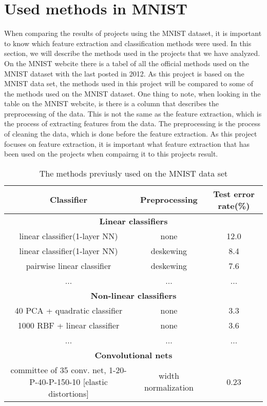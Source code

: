 \section{Used methods in MNIST}
\label{sec:method-MNIST}
When comparing the results of projects using the MNIST dataset, it is important to know which feature extraction and classification methods were used. In this section, we will describe the methods used in the projects that we have analyzed. 
On the MNIST webcite \cite{MNIST} there is a tabel of all the official methods used on the MNIST dataset with the last posted in 2012. As this project is based on the MNIST data set, the methods used in this project will be compared to some of the methods used on the MNIST dataset. One thing to note, when looking in the table on the MNIST webcite, is there is a column that describes the preprocessing of the data. 
This is not the same as the feature extraction, which is the process of extracting features from the data. The preprocessing is the process of cleaning the data, which is done before the feature extraction. As this project focuses on feature extraction, it is important what feature extraction that has been used on the projects when compairng it to this projects result. 
\begin{table}[h]
  \centering
  \resizebox{1\textwidth}{!}
  {
  \begin{tabular}{|c|c|c|}
      \hline
      Classifier & Preprocessing & Test error rate(\%)\\
      \hline
      \multicolumn{3}{|c|}{\textbf{Linear classifiers}} \\
      \hline
      linear classifier(1-layer NN) & none & 12.0 \\
      linear classifier(1-layer NN) & deskewing & 8.4 \\
      pairwise linear classifier & deskewing & 7.6 \\
      \hline
      ... & ... & ... \\ 
      \hline
      \multicolumn{3}{|c|}{\textbf{Non-linear classifiers}} \\
      \hline
      40 PCA + quadratic classifier & none & 3.3 \\
      1000 RBF + linear classifier & none & 3.6 \\
      \hline
      ... & ... & ... \\ 
      \hline
      \multicolumn{3}{|c|}{\textbf{Convolutional nets}} \\
      \hline
      committee of 35 conv. net, 1-20-P-40-P-150-10 [elastic distortions] & width normalization & 0.23 \\
      \hline
  \end{tabular}
  }
  \caption{The methods previusly used on the MNIST data set}
  \label{tab:method-MNIST}
\end{table}
